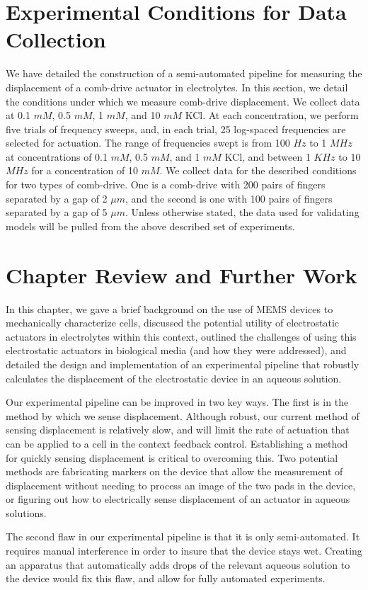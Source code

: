 \section{Experimental Conditions for Data Collection}
We have detailed the construction of a semi-automated pipeline for measuring the displacement of a comb-drive actuator in electrolytes. In this section, we detail the conditions under which we measure comb-drive displacement. We collect data at 0.1 $mM$, 0.5 $mM$, 1 $mM$, and 10 $mM$ KCl. At each concentration, we perform five trials of frequency sweeps, and, in each trial, 25 log-spaced frequencies are selected for actuation. The range of frequencies swept is from 100 $Hz$ to 1 $MHz$ at concentrations of 0.1 $mM$, 0.5 $mM$, and 1 $mM$ KCl, and between 1 $KHz$ to 10 $MHz$ for a concentration of 10 $mM$. We collect data for the described conditions for two types of comb-drive. One is a comb-drive with 200 pairs of fingers separated by a gap of 2 $\mu m$, and the second is one with 100 pairs of fingers separated by a gap of 5 $\mu m$. Unless otherwise stated, the data used for validating models will be pulled from the above described set of experiments. 
\section{Chapter Review and Further Work}
In this chapter, we gave a brief background on the use of MEMS devices to mechanically characterize cells, discussed the potential utility of electrostatic actuators in electrolytes within this context, outlined the challenges of using this electrostatic actuators in biological media (and how they were addressed), and detailed the design and implementation of an experimental pipeline that robustly calculates the displacement of the electrostatic device in an aqueous solution. 

Our experimental pipeline can be improved in two key ways. The first is in the method by which we sense displacement. Although robust, our current method of sensing displacement is relatively slow, and will limit the rate of actuation that can be applied to a cell in the context feedback control. Establishing a method for quickly sensing displacement is critical to overcoming this.  Two potential methods are fabricating markers on the device that allow the measurement of displacement without needing to process an image of the two pads in the device, or figuring out how to electrically sense displacement of an actuator in aqueous solutions.

The second flaw in our experimental pipeline is that it is only semi-automated. It requires manual interference in order to insure that the device stays wet. Creating an apparatus that automatically adds drops of the relevant aqueous solution to the device would fix this flaw, and allow for fully automated experiments. 













